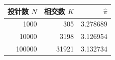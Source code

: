 \begin{tabular}{rrr}
\toprule
投针数 $N$ & 相交数 $K$ & $\widehat{\pi}$ \\
\midrule
1000 & 305 & 3.278689 \\
10000 & 3198 & 3.126954 \\
100000 & 31921 & 3.132734 \\
\bottomrule
\end{tabular}
